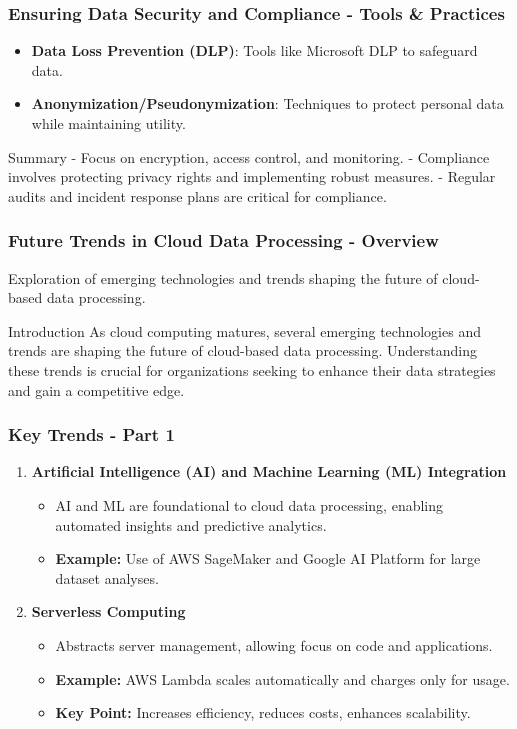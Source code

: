 \documentclass{beamer}
\begin{document}
\begin{frame}[fragile]
    \frametitle{Ensuring Data Security and Compliance - Tools & Practices}
    \begin{itemize}
        \item \textbf{Data Loss Prevention (DLP)}: Tools like Microsoft DLP to safeguard data.
        \item \textbf{Anonymization/Pseudonymization}: Techniques to protect personal data while maintaining utility.
    \end{itemize}

    \begin{block}{Summary}
        - Focus on encryption, access control, and monitoring.
        - Compliance involves protecting privacy rights and implementing robust measures.
        - Regular audits and incident response plans are critical for compliance.
    \end{block}
\end{frame}

\begin{frame}[fragile]
    \frametitle{Future Trends in Cloud Data Processing - Overview}
    Exploration of emerging technologies and trends shaping the future of cloud-based data processing.
    
    \begin{block}{Introduction}
        As cloud computing matures, several emerging technologies and trends are shaping the future of cloud-based data processing. Understanding these trends is crucial for organizations seeking to enhance their data strategies and gain a competitive edge.
    \end{block}
\end{frame}

\begin{frame}[fragile]
    \frametitle{Key Trends - Part 1}
    \begin{enumerate}
        \item \textbf{Artificial Intelligence (AI) and Machine Learning (ML) Integration}
            \begin{itemize}
                \item AI and ML are foundational to cloud data processing, enabling automated insights and predictive analytics.
                \item \textbf{Example:} Use of AWS SageMaker and Google AI Platform for large dataset analyses.
            \end{itemize}
    
        \item \textbf{Serverless Computing}
            \begin{itemize}
                \item Abstracts server management, allowing focus on code and applications.
                \item \textbf{Example:} AWS Lambda scales automatically and charges only for usage.
                \item \textbf{Key Point:} Increases efficiency, reduces costs, enhances scalability.
            \end{itemize}
    \end{enumerate}
\end{frame}
\end{document}
